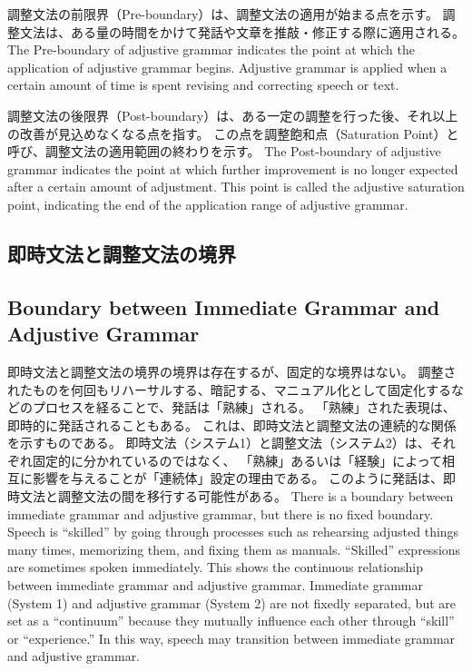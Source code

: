 \documentclass[a4paper,xelatex,ja=standard]{bxjsarticle}
\begin{document}
\ifJPN
調整文法の前限界（Pre-boundary）は、調整文法の適用が始まる点を示す。  
調整文法は、ある量の時間をかけて発話や文章を推敲・修正する際に適用される。  
\else
The Pre-boundary of adjustive grammar indicates the point at which the application of adjustive grammar begins.
Adjustive grammar is applied when a certain amount of time is spent revising and correcting speech or text.
\fi

\ifJPN
調整文法の後限界（Post-boundary）は、ある一定の調整を行った後、それ以上の改善が見込めなくなる点を指す。  
この点を調整飽和点（Saturation Point）と呼び、調整文法の適用範囲の終わりを示す。
\else
The Post-boundary of adjustive grammar indicates the point at which further improvement is no longer expected after a certain amount of adjustment.
This point is called the adjustive saturation point, indicating the end of the application range of adjustive grammar.
\fi

\ifJPN
\subsection{即時文法と調整文法の境界}
\else
\subsection{Boundary between Immediate Grammar and Adjustive Grammar}
\fi

\ifJPN
即時文法と調整文法の境界の境界は存在するが、固定的な境界はない。
調整されたものを何回もリハーサルする、暗記する、マニュアル化として固定化するなどのプロセスを経ることで、発話は「熟練」される。
「熟練」された表現は、即時的に発話されることもある。
これは、即時文法と調整文法の連続的な関係を示すものである。
即時文法（システム1）と調整文法（システム2）は、それぞれ固定的に分かれているのではなく、
「熟練」あるいは「経験」によって相互に影響を与えることが「連続体」設定の理由である。
このように発話は、即時文法と調整文法の間を移行する可能性がある。
\else
There is a boundary between immediate grammar and adjustive grammar, but there is no fixed boundary.
Speech is ``skilled'' by going through processes such as rehearsing adjusted things many times, memorizing them, and fixing them as manuals.
``Skilled'' expressions are sometimes spoken immediately.
This shows the continuous relationship between immediate grammar and adjustive grammar.
Immediate grammar (System 1) and adjustive grammar (System 2) are not fixedly separated, but are set as a ``continuum'' because they mutually influence each other through ``skill'' or ``experience.''
In this way, speech may transition between immediate grammar and adjustive grammar.
\fi
\end{document}
